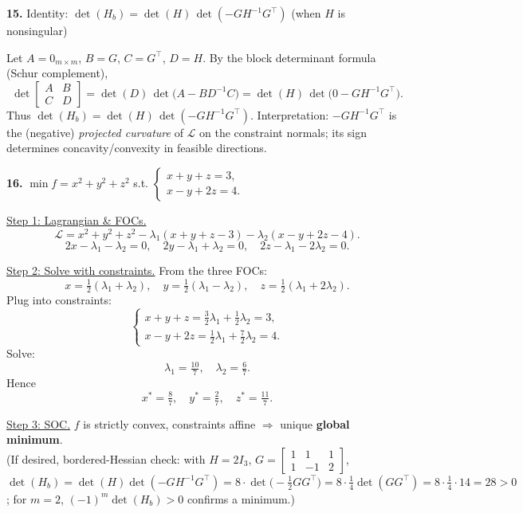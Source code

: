 \documentclass[12pt]{article}
\begin{document}
\medskip

\textbf{15.} Identity: $\det(H_b)=\det(H)\,\det(-G H^{-1}G^\top)$ (when $H$ is nonsingular)

Let $A=0_{m\times m}$, $B=G$, $C=G^\top$, $D=H$. By the block determinant formula (Schur complement),
\[
\det\begin{bmatrix}A&B\\ C&D\end{bmatrix}
=\det(D)\,\det\big(A-BD^{-1}C\big)
=\det(H)\,\det\big(0-GH^{-1}G^\top\big).
\]
Thus $\det(H_b)=\det(H)\,\det(-G H^{-1}G^\top)$.
Interpretation: $-GH^{-1}G^\top$ is the (negative) \emph{projected curvature} of $\mathcal{L}$ on the constraint normals; its sign determines concavity/convexity in feasible directions.

\medskip

\textbf{16.} $\min f=x^2+y^2+z^2$ s.t. 
$\begin{cases}
x+y+z=3,\\
x-y+2z=4.
\end{cases}$

\underline{Step 1: Lagrangian \& FOCs.}
\[
\mathcal{L}=x^2+y^2+z^2-\lambda_1(x+y+z-3)-\lambda_2(x-y+2z-4).
\]
\[
2x-\lambda_1-\lambda_2=0,\quad 2y-\lambda_1+\lambda_2=0,\quad 2z-\lambda_1-2\lambda_2=0.
\]

\underline{Step 2: Solve with constraints.}
From the three FOCs:
\[
x=\tfrac{1}{2}(\lambda_1+\lambda_2),\quad
y=\tfrac{1}{2}(\lambda_1-\lambda_2),\quad
z=\tfrac{1}{2}(\lambda_1+2\lambda_2).
\]
Plug into constraints:
\[
\begin{cases}
x+y+z=\tfrac{3}{2}\lambda_1+\tfrac{1}{2}\lambda_2=3,\\
x-y+2z=\tfrac{1}{2}\lambda_1+\tfrac{7}{2}\lambda_2=4.
\end{cases}
\]
Solve:
\[
\lambda_1=\tfrac{10}{7},\quad \lambda_2=\tfrac{6}{7}.
\]
Hence
\[
x^\ast=\tfrac{8}{7},\quad y^\ast=\tfrac{2}{7},\quad z^\ast=\tfrac{11}{7}.
\]

\underline{Step 3: SOC.}
$f$ is strictly convex, constraints affine $\Rightarrow$ unique \textbf{global minimum}.\\
(If desired, bordered-Hessian check: with $H=2I_3$, $G=\begin{bmatrix}1&1&1\\ 1&-1&2\end{bmatrix}$,
$\det(H_b)=\det(H)\det(-GH^{-1}G^\top)=8\cdot \det\!\big(-\tfrac12 GG^\top\big)=8\cdot \tfrac{1}{4}\det(GG^\top)=8\cdot \tfrac{1}{4}\cdot 14=28>0$; for $m=2$, $(-1)^m\det(H_b)>0$ confirms a minimum.)
\end{document}
